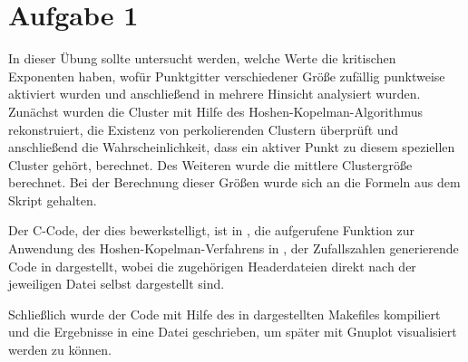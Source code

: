 \section*{Aufgabe 1}
In dieser Übung sollte untersucht werden, welche Werte die kritischen Exponenten
haben, wofür Punktgitter verschiedener Größe zufällig punktweise aktiviert wurden
und anschließend in mehrere Hinsicht analysiert wurden. Zunächst wurden die Cluster
mit Hilfe des Hoshen-Kopelman-Algorithmus rekonstruiert, die Existenz
von perkolierenden Clustern überprüft und anschließend die Wahrscheinlichkeit, dass
ein aktiver Punkt zu diesem speziellen Cluster gehört, berechnet. Des Weiteren
wurde die mittlere Clustergröße berechnet. Bei der Berechnung dieser Größen wurde
sich an die Formeln aus dem Skript gehalten.

Der C-Code, der dies bewerkstelligt, ist in , die aufgerufene
Funktion zur Anwendung des Hoshen-Kopelman-Verfahrens in , der Zufallszahlen
generierende Code in  dargestellt, wobei die zugehörigen Headerdateien 
direkt nach der jeweiligen Datei selbst dargestellt sind.







Schließlich wurde der Code mit Hilfe des in  dargestellten Makefiles
kompiliert und die Ergebnisse in eine Datei geschrieben, um später mit Gnuplot
visualisiert werden zu können.


